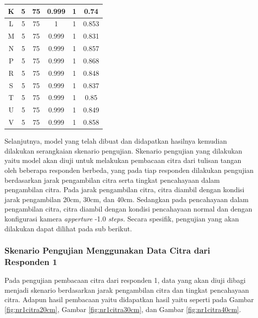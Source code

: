 \begin{center}
\begin{longtable}[c]{|c|c|c|c|c|c|}
    K      & 5      & 75     & 0.999      & 1      & 0.74     \\ \hline
    L      & 5      & 75     & 1          & 1      & 0.853    \\ \hline
    M      & 5      & 75     & 0.999      & 1      & 0.831    \\ \hline
    N      & 5      & 75     & 0.999      & 1      & 0.857    \\ \hline
    P      & 5      & 75     & 0.999      & 1      & 0.868    \\ \hline
    R      & 5      & 75     & 0.999      & 1      & 0.848    \\ \hline
    S      & 5      & 75     & 0.999      & 1      & 0.837    \\ \hline
    T      & 5      & 75     & 0.999      & 1      & 0.85     \\ \hline
    U      & 5      & 75     & 0.999      & 1      & 0.849    \\ \hline
    V      & 5      & 75     & 0.999      & 1      & 0.858    \\ \hline 
  \end{longtable}
\end{center}

Selanjutnya, model yang telah dibuat dan didapatkan hasilnya kemudian dilakukan serangkaian skenario pengujian. Skenario pengujian yang dilakukan yaitu model akan diuji untuk melakukan pembacaan citra dari tulisan tangan oleh beberapa responden berbeda, yang pada tiap responden dilakukan pengujian berdasarkan jarak pengambilan citra serta tingkat pencahayaan dalam pengambilan citra. Pada jarak pengambilan citra, citra diambil dengan kondisi jarak pengambilan 20cm, 30cm, dan 40cm. Sedangkan pada pencahayaan dalam pengambilan citra, citra diambil dengan kondisi pencahayaan normal dan dengan konfigurasi kamera \textit{apperture} -1.0 \textit{steps.} Secara spesifik, pengujian yang akan dilakukan dapat dilihat pada sub berikut.

\subsubsection{Skenario Pengujian Menggunakan Data Citra dari Responden 1}
\label{subsubsec:nskenarioresponden1}

Pada pengujian pembacaan citra dari responden 1, data yang akan diuji dibagi menjadi skenario berdasarkan jarak pengambilan citra dan tingkat pencahayaan citra. Adapun hasil pembacaan yaitu didapatkan hasil yaitu seperti pada Gambar \ref*{fig:nr1citra20cm}, Gambar \ref*{fig:nr1citra30cm}, dan Gambar \ref*{fig:nr1citra40cm}.

